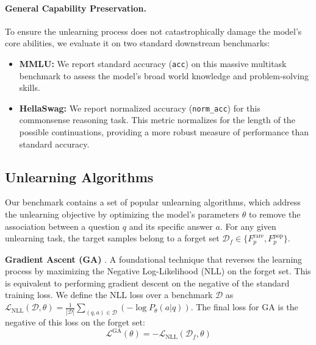 \paragraph{General Capability Preservation.}
To ensure the unlearning process does not catastrophically damage the model's core abilities, we evaluate it on two standard downstream benchmarks:
\begin{itemize}
    \item \textbf{MMLU:} We report standard accuracy (\texttt{acc}) on this massive multitask benchmark to assess the model's broad world knowledge and problem-solving skills.
    \item \textbf{HellaSwag:} We report normalized accuracy (\texttt{norm\_acc}) for this commonsense reasoning task. This metric normalizes for the length of the possible continuations, providing a more robust measure of performance than standard accuracy.
\end{itemize}


\subsection{Unlearning Algorithms} %
\label{sec:train}

Our benchmark contains a set of popular unlearning algorithms, which address the unlearning objective by optimizing the model's parameters $\theta$ to remove the association between a question $q$ and its specific answer $a$. For any given unlearning task, the target samples belong to a forget set $\mathcal{D}_f \in \{F_p^{\text{rare}}, F_p^{\text{pop}}\}$.

\textbf{Gradient Ascent (GA)} \cite{jang2022knowledge}. 
A foundational technique that reverses the learning process by maximizing the Negative Log-Likelihood (NLL) on the forget set. This is equivalent to performing gradient descent on the negative of the standard training loss. We define the NLL loss over a benchmark $\mathcal{D}$ as $\mathcal{L}_{\text{NLL}}(\mathcal{D}, \theta) = \frac{1}{|\mathcal{D}|} \sum_{(q,a) \in \mathcal{D}} (-\log P_{\theta}(a|q))$. The final loss for GA is the negative of this loss on the forget set:
\begin{equation}
\mathcal{L}^{\text{GA}}(\theta) = - \mathcal{L}_{\text{NLL}}(\mathcal{D}_f, \theta)
\end{equation}

